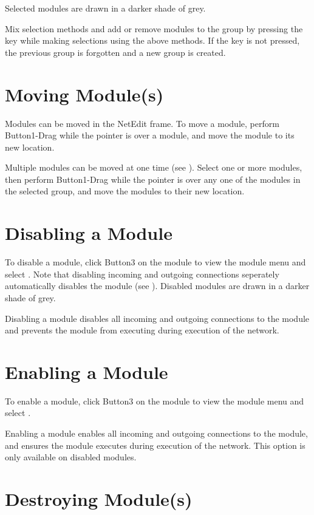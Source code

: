 Selected modules are drawn in a darker shade of grey.

Mix selection methods and add or remove modules to the group by pressing the
 key while making selections using the above
methods.  If the  key is not pressed, the previous group is
forgotten and a new group is created.

\section{Moving Module(s)}
\label{sec:movemod}

Modules can be moved in the NetEdit frame.  To move a module, perform 
Button1-Drag while the pointer is over a
module, and move the module to its new location.

Multiple modules can be moved at one time
(see ).
Select one or more modules, then perform Button1-Drag while the pointer is
over any one of the modules in the selected group,
and move the modules to their new location.

\section{Disabling a Module}
\label{sec:disablemod}

To disable a module, click Button3 on the module to view
the module menu and select . Note that disabling
incoming and outgoing connections seperately automatically disables
the module (see ).
Disabled modules are drawn in a darker shade of grey.

Disabling a module disables all incoming and outgoing connections to
the module and prevents the module from executing during execution of
the network.

\section{Enabling a Module}
\label{sec:enablemod}

To enable a module, click Button3 on the module to view the
module menu and select .

Enabling a module enables all incoming and outgoing connections to the
module, and ensures the module executes during execution of the
network. This option is only available on disabled modules.

\section{Destroying Module(s)}
\label{sec:destroymod}

